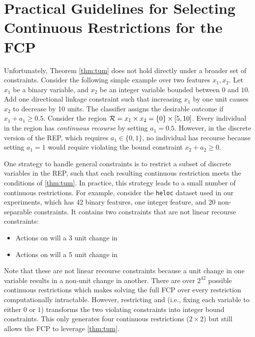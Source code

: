 \section{Practical Guidelines for Selecting Continuous Restrictions for the FCP} \label{app:relax_disc}

Unfortunately, Theorem \ref{thm:tum} does not hold directly under a broader set of constraints. Consider the following simple example over two features $x_1, x_2$. Let $x_1$ be a binary variable, and $x_2$ be an integer variable bounded between $0$ and $10$. Add one directional linkage constraint such that increasing $x_1$ by one unit causes $x_2$ to decrease by 10 units. The classifier assigns the desirable outcome if $x_1 + a_1 \geq 0.5$. Consider the region ${\cal R} = x_1 \times x_2 = \{0\} \times [5,10]$. Every individual in the region has \emph{continuous recourse} by setting $a_1 = 0.5$. However, in the discrete version of the REP, which requires $a_1 \in \{0,1\}$, no individual has recourse because setting $a_1 = 1$ would require violating the bound constraint $x_2 + a_2 \geq 0$.

One strategy to handle general constraints is to restrict a subset of discrete variables in the REP, such that each resulting continuous restriction meets the conditions of \cref{thm:tum}.
In practice, this strategy leads to a small number of continuous restrictions. For example, consider the \texttt{heloc} dataset used in our experiments, which has 42 binary features, one integer feature, and 20 non-separable constraints. It contains two constraints that are not linear recourse constraints:
\begin{itemize}
    \item Actions on  will a 3 unit change in 
    \item Actions on  will a 5 unit change in 
\end{itemize}
Note that these are not linear recourse constraints because a unit change in one variable results in a non-unit change in another. There are over $2^{42}$ possible continuous restrictions which makes solving the full FCP over every restriction computationally intractable. However, restricting  and  (i.e., fixing each variable to either $0$ or $1$) transforms the two violating constraints into integer bound constraints. This only generates four continuous restrictions ($2 \times 2$) but still allows the FCP to leverage \cref{thm:tum}. 


